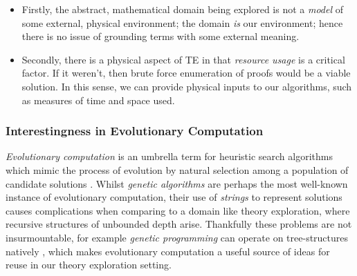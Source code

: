 \begin{itemize}

  \item Firstly, the abstract, mathematical domain being explored is not a \emph{model} of some external, physical environment; the domain \emph{is} our environment; hence there is no issue of grounding terms with some external meaning.

  \item Secondly, there is a physical aspect of TE in that \emph{resource usage} is a critical factor. If it weren't, then brute force enumeration of proofs would be a viable solution. In this sense, we can provide physical inputs to our algorithms, such as measures of time and space used.

\end{itemize}

\iffalse

\subsubsection{Universal Drives}

PhysRevLett.110.168702.pdf
Omohundro? Too physical.
\emph{Universal drives} are those

\fi

\iffalse
TODO
\subsection{Conjecture Generation}

The task of \emph{conjecture generation} lies at the heart of theory exploration, and whilst its main use has been for lemma generation (i.e. performing ) and even significant theorems.

\fi

\subsubsection{Interestingness in Evolutionary Computation}

\emph{Evolutionary computation} is an umbrella term for heuristic search algorithms which mimic the process of evolution by natural selection among a population of candidate solutions \citep{back1997evolutionary}. Whilst \emph{genetic algorithms} are perhaps the most well-known instance of evolutionary computation, their use of \emph{strings} to represent solutions causes complications when comparing to a domain like theory exploration, where recursive structures of unbounded depth arise. Thankfully these problems are not insurmountable, for example \emph{genetic programming} can operate on tree-structures natively \citep{banzhaf1998genetic}, which makes evolutionary computation a useful source of ideas for reuse in our theory exploration setting.

